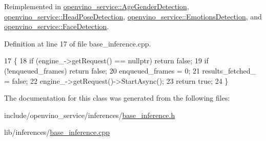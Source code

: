 Reimplemented in \hyperlink{classopenvino__service_1_1AgeGenderDetection_ac958ea8415ea449db0613f396d227611}{openvino\+\_\+service\+::\+Age\+Gender\+Detection}, \hyperlink{classopenvino__service_1_1HeadPoseDetection_ac985e9d741eeacdd75467f9929aaf0f7}{openvino\+\_\+service\+::\+Head\+Pose\+Detection}, \hyperlink{classopenvino__service_1_1EmotionsDetection_ab4a36bef8e7b0af39f7965cf8c5f9d7b}{openvino\+\_\+service\+::\+Emotions\+Detection}, and \hyperlink{classopenvino__service_1_1FaceDetection_ad8c87c0d59af0f36030fed55a0bcec4b}{openvino\+\_\+service\+::\+Face\+Detection}.



Definition at line 17 of file base\+\_\+inference.\+cpp.


\begin{DoxyCode}
17                                                   \{
18   \textcolor{keywordflow}{if} (engine\_->getRequest() == \textcolor{keyword}{nullptr}) \textcolor{keywordflow}{return} \textcolor{keyword}{false};
19   \textcolor{keywordflow}{if} (!enqueued\_frames) \textcolor{keywordflow}{return} \textcolor{keyword}{false};
20   enqueued\_frames = 0;
21   results\_fetched\_ = \textcolor{keyword}{false};
22   engine\_->getRequest()->StartAsync();
23   \textcolor{keywordflow}{return} \textcolor{keyword}{true};
24 \}
\end{DoxyCode}


The documentation for this class was generated from the following files\+:\begin{DoxyCompactItemize}
\item 
include/openvino\+\_\+service/inferences/\hyperlink{base__inference_8h}{base\+\_\+inference.\+h}\item 
lib/inferences/\hyperlink{base__inference_8cpp}{base\+\_\+inference.\+cpp}\end{DoxyCompactItemize}
